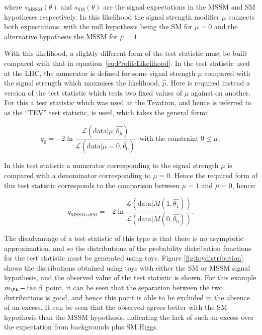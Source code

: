 where $s_{\text{MSSM}}(\theta)$ and $s_{\text{SM}}(\theta)$ are the
signal expectations in the \ac{MSSM} and \ac{SM} hypotheses respectively. In
this likelihood the signal strength modifier $\mu$ connects both expectations,
with the null hypothesis being the \ac{SM} for $\mu=0$ and the alternative
hypothesis the \ac{MSSM} for $\mu=1$. 

With this likelihood, a slightly different form of the test statistic must be
built compared with that in equation~\ref{eq:ProfileLikelihood}. In the test
statistic used at the \ac{LHC}, the numerator is defined for some signal
strength $\mu$ compared with the signal strength which maxmises the likelihood,
$\hat{\mu}$. Here is required instead a version of the test statistic which tests
two fixed values of $\mu$ against on another. For this a test statistic
which was used at the Tevatron, and hence is referred to as the ``TEV'' test
statistic, is used, which takes the general form:

\begin{equation}
q_{0} = -2\ln\frac{\mathcal{L}(\text{data}| \mu,\hat{\theta_{\mu}} ) }
{\mathcal{L}(\text{data}|\mu=0,\hat{\theta_{0}})}
\;\; \text{with the constraint} \; 0\leq\mu\, .
\end{equation}

In this test statistic a numerator corresponding to the signal strength $\mu$ is
compared with a denominator corresponding to $\mu=0$. Hence the required form of this
test statistic corresponds to the comparison between
$\mu=1$ and $\mu=0$, hence:

\begin{equation}
q_{\text{MSSMvsSM}} = -2\ln\frac{\mathcal{L}(\text{data}| M(1,\hat{\theta_{1}}) ) }
{\mathcal{L}(\text{data}| M(0,\hat{\theta_{0}}) )}.
\label{eq:qMSSMvsSM}
\end{equation}

The disadvantage of a test statistic of this type is that there is no asymptotic
approximation, and so the distributions of the probability distribution
functions for the test statistic must be generated using toys. Figure
\ref{fig:toydistribution} shows the distributions obtained using toys with
either the \ac{SM} or \ac{MSSM} signal hypothesis, and the observed value of the
test statistic is shown. For this example $m_{\PA}-\tan\beta$ point, it can be
seen that the separation between the two distributions is good, and hence this
point is able to be excluded in the absence of an excess. It can be seen that
the observed agrees better with the \ac{SM} hypothesis than the \ac{MSSM}
hypothesis, indicating the lack of such an excess over the expectation from
backgrounds plus \ac{SM} Higgs. 

